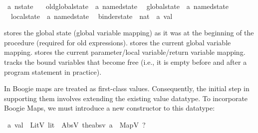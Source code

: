\begin{isabellebody}
\isamarkupfalse%
\ {\isacharprime}{\kern0pt}a{\kern0pt}\ nstate\ {\isacharequal}{\kern0pt}\isanewline
\ \ old{\isacharunderscore}{\kern0pt}global{\isacharunderscore}{\kern0pt}state\ {\isacharcolon}{\kern0pt}{\isacharcolon}{\kern0pt}\ {\isachardoublequoteopen}{\isacharprime}{\kern0pt}a{\kern0pt}\ named{\isacharunderscore}{\kern0pt}state{\isachardoublequoteclose}\isanewline
\ \ global{\isacharunderscore}{\kern0pt}state\ {\isacharcolon}{\kern0pt}{\isacharcolon}{\kern0pt}\ {\isachardoublequoteopen}{\isacharprime}{\kern0pt}a{\kern0pt}\ named{\isacharunderscore}{\kern0pt}state{\isachardoublequoteclose}\isanewline
\ \ local{\isacharunderscore}{\kern0pt}state\ {\isacharcolon}{\kern0pt}{\isacharcolon}{\kern0pt}\ {\isachardoublequoteopen}{\isacharprime}{\kern0pt}a{\kern0pt}\ named{\isacharunderscore}{\kern0pt}state{\isachardoublequoteclose}\isanewline
\ \ binder{\isacharunderscore}{\kern0pt}state\ {\isacharcolon}{\kern0pt}{\isacharcolon}{\kern0pt}\ {\isachardoublequoteopen}nat\ {\isasymrightharpoonup}\ {\isacharprime}{\kern0pt}a{\kern0pt}\ val{\isachardoublequoteclose}%
\begin{isamarkuptext}%
 stores the global state (global variable mapping) 
as it was at the beginning of the procedure (required for old expressions).
 stores the current global variable mapping.
 stores the current parameter/local variable/return variable mapping.
 tracks the bound variables that become free (i.e., it is empty before and
after a program statement in practice).%
\end{isamarkuptext}\isamarkuptrue%
\end{isabellebody}


In Boogie maps are treated as first-class values.
Consequently, the initial step in supporting them involves extending the existing value datatype.
To incorporate Boogie Maps, we must introduce a new constructor to this datatype:

\begin{isabellebody}\isanewline
{}\isamarkupfalse%
\ {\isacharprime}{\kern0pt}a{\kern0pt}\ val\ {\isacharequal}{\kern0pt}\ LitV\ lit\ {\isacharbar}{\kern0pt}\ AbsV\ {\isacharparenleft}{\kern0pt}the{\isacharunderscore}{\kern0pt}absv{\isacharcolon}{\kern0pt}\ {\isacharprime}{\kern0pt}a{\isacharparenright}{\kern0pt}\ {\isacharbar}{\kern0pt}\ MapV\ ?
\end{isabellebody}

